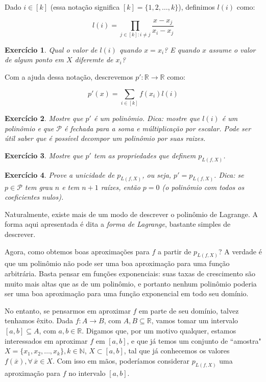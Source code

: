 \documentclass[]{article}
\newtheorem{exercicio}{Exercício}
\numberwithin{equation}{section}
\begin{document}
Dado $i \in [k]$ (essa notação significa $[k] = \{1, 2, \dots, k\}$),
definimos $l(i)$ como:

$$
l(i) = \prod_{j \in [k] : i \neq j} \frac{x - x_j}{x_i - x_j}
$$

\begin{exercicio}
  Qual o valor de $l(i)$ quando $x = x_i$? E quando $x$ assume o valor
  de algum ponto em $X$ diferemte de $x_i$?
\end{exercicio}

Com a ajuda dessa notação, descrevemos
$p' : \mathbb{R} \to \mathbb{R}$ como:

$$
p'(x) = \sum_{i \in [k]} f(x_i)l(i)
$$

\begin{exercicio}
  Mostre que $p'$ é um polinômio. Dica: mostre que $l(i)$ é um
  polinômio e que $\mathcal{P}$ é fechada para a soma e múltiplicação
  por escalar. Pode ser útil saber que é possível decompor um
  polinômio por suas raizes.
\end{exercicio}

\begin{exercicio}
  Mostre que $p'$ tem as propriedades que definem $p_{L(f, X)}$.
\end{exercicio}

\begin{exercicio}
  Prove a unicidade de $p_{L(f, X)}$, ou seja, $p' = p_{L(f,
    X)}$. Dica: se $p \in \mathcal{P}$ tem grau $n$ e tem $n + 1$
  raízes, então $p = 0$ (o polinômio com todos os coeficientes nulos).
\end{exercicio}

Naturalmente, existe mais de um modo de descrever o polinômio de
Lagrange. A forma aqui apresentada é dita a \emph{forma de Lagrange},
bastante simples de descrever.

Agora, como obtemos boas aproximações para $f$ a partir de
$p_{L(f, X)}$? A verdade é que um polinômio não pode ser uma boa
aproximação para uma função arbitrária. Basta pensar em funções
exponenciais: suas taxas de crescimento são muito mais altas que as de
um polinômio, e portanto nenhum polinômio poderia ser uma boa
aproximação para uma função exponencial em todo seu domínio.

No entanto, se pensarmos em aproximar $f$ em parte de seu domínio,
talvez tenhamos êxito. Dada $f : A \to B$, com
$A, B \subseteq \mathbb{R}$, vamos tomar um intervalo
$[a, b] \subseteq A$, com $a, b \in \mathbb{R}$. Digamos que, por um
motivo qualquer, estamos interessados em aproximar $f$ em $[a, b]$, e
que já temos um conjunto de ``amostra"
$X = \{x_1, x_2, \dots, x_k\}, k \in \mathbb{N}$, $X \subset [a, b]$,
tal que já conhecemos os valores
$f(\overline{x}), \forall\, \overline{x} \in X$. Com isso em mãos,
poderíamos considerar $p_{L(f, X)}$ uma aproximação para $f$ no
intervalo $[a, b]$.
\end{document}
